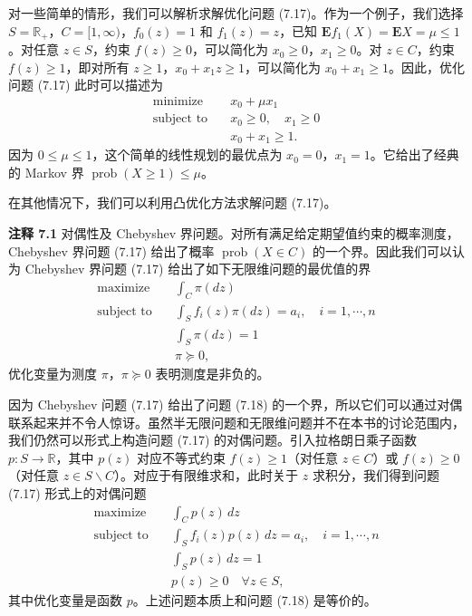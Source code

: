 \documentclass[UTF8,12pt,a4paper,fontset=fandol]{ctexart}
\begin{document}
对一些简单的情形，我们可以解析求解优化问题 (7.17)。作为一个例子，我们选择 $S=\mathbb{R}_+$，$C=[1,\infty)$，$f_0(z)=1$ 和 $f_1(z)=z$，已知 $\mathbf{E}f_1(X)=\mathbf{E}X=\mu\leq 1$。对任意 $z\in S$，约束 $f(z)\geq 0$，可以简化为 $x_0\geq 0$，$x_1\geq 0$。对 $z\in C$，约束 $f(z)\geq 1$，即对所有 $z\geq 1$，$x_0+x_1z\geq 1$，可以简化为 $x_0+x_1\geq 1$。因此，优化问题 (7.17) 此时可以描述为
\[
\begin{aligned}
\text{minimize}\quad & x_0+\mu x_1\\
\text{subject to}\quad & x_0\geq 0,\quad x_1\geq 0\\
& x_0+x_1\geq 1.
\end{aligned}
\]
因为 $0\leq \mu\leq 1$，这个简单的线性规划的最优点为 $x_0=0$，$x_1=1$。它给出了经典的 Markov 界 $\operatorname{prob}(X\geq 1)\leq\mu$。

在其他情况下，我们可以利用凸优化方法求解问题 (7.17)。

\noindent\textbf{注释 7.1}\quad
对偶性及 Chebyshev 界问题。对所有满足给定期望值约束的概率测度，Chebyshev 界问题 (7.17) 给出了概率 $\operatorname{prob}(X\in C)$ 的一个界。因此我们可以认为 Chebyshev 界问题 (7.17) 给出了如下无限维问题的最优值的界
\begin{equation}
\begin{aligned}
\text{maximize}\quad & \int_C \pi(dz)\\
\text{subject to}\quad & \int_S f_i(z)\pi(dz)=a_i,\quad i=1,\cdots,n\\
& \int_S \pi(dz)=1\\
& \pi\succeq 0,
\end{aligned}
\tag{7.18}
\end{equation}
优化变量为测度 $\pi$，$\pi\succeq 0$ 表明测度是非负的。

因为 Chebyshev 问题 (7.17) 给出了问题 (7.18) 的一个界，所以它们可以通过对偶联系起来并不令人惊讶。虽然半无限问题和无限维问题并不在本书的讨论范围内，我们仍然可以形式上构造问题 (7.17) 的对偶问题。引入拉格朗日乘子函数 $p:S\to\mathbb{R}$，其中 $p(z)$ 对应不等式约束 $f(z)\geq 1$（对任意 $z\in C$）或 $f(z)\geq 0$（对任意 $z\in S\backslash C$）。对应于有限维求和，此时关于 $z$ 求积分，我们得到问题 (7.17) 形式上的对偶问题
\[
\begin{aligned}
\text{maximize}\quad & \int_C p(z)\,dz\\
\text{subject to}\quad & \int_S f_i(z)p(z)\,dz=a_i,\quad i=1,\cdots,n\\
& \int_S p(z)\,dz=1\\
& p(z)\geq 0\quad \forall z\in S,
\end{aligned}
\]
其中优化变量是函数 $p$。上述问题本质上和问题 (7.18) 是等价的。
\end{document}
